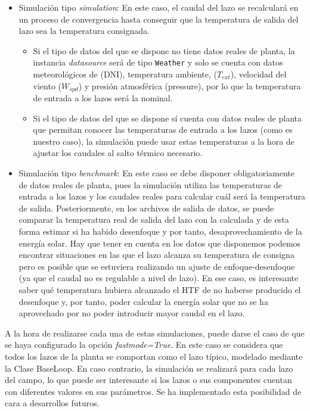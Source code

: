 \begin{itemize}
\item
  Simulación tipo \emph{simulation}: En este caso, el caudal del lazo se recalculará en un proceso de convergencia hasta conseguir que la   temperatura de salida del lazo sea la temperatura consignada.

  \begin{itemize}
  \item
    Si el tipo de datos del que se dispone no tiene datos reales de  planta, la instancia \emph{datasource} será de tipo \texttt{Weather} y solo  se cuenta con datos meteorológicos  de (DNI), temperatura ambiente, ($T_{ext}$), velocidad del viento ($W_{spd}$) y presión atmosférica (pressure), por lo que la temperatura de   entrada a los lazos será la nominal. 
  \item
    Si el tipo de datos del que se dispone sí cuenta con datos reales de  planta que permitan conocer las temperaturas de entrada a los lazos  (como es nuestro caso), la simulación puede usar estas temperaturas a la hora de ajustar los caudales al salto térmico necesario.
  \end{itemize}
\item
  Simulación tipo \emph{benchmark}: En este caso se debe disponer  obligatoriamente de datos reales de planta, pues la simulación utiliza  las temperaturas de entrada a los lazos y los caudales reales para calcular cuál será la temperatura de salida. Posteriormente, en los  archivos de salida de datos, se puede comparar la temperatura real de  salida del lazo con la calculada y de esta forma estimar si ha habido desenfoque y por tanto, desaprovechamiento de la energía solar. Hay   que tener en cuenta en los datos que disponemos podemos encontrar   situaciones en las que el lazo alcanza su temperatura de consigna pero es posible que se estuviera realizando un ajuste de enfoque-desenfoque   (ya que el caudal no es regulable a nivel de lazo). En ese caso, es   interesante saber qué temperatura hubiera alcanzado el HTF de no haberse   producido el desenfoque y, por tanto, poder calcular la energía solar   que no se ha aprovechado por no poder introducir mayor caudal en el  lazo.
\end{itemize}

A la hora de realizarse cada una de estas simulaciones, puede darse el caso de que se haya configurado la opción \emph{fastmode=True}. En este caso se considera que todos los lazos de la planta se comportan como el lazo típico, modelado mediante la Clase BaseLoop. En caso contrario, la simulación se realizará para cada lazo del campo, lo que puede ser interesante si los lazos o sus componentes cuentan con diferentes valores en sus parámetros. Se ha implementado esta posibilidad de cara a desarrollos futuros.

